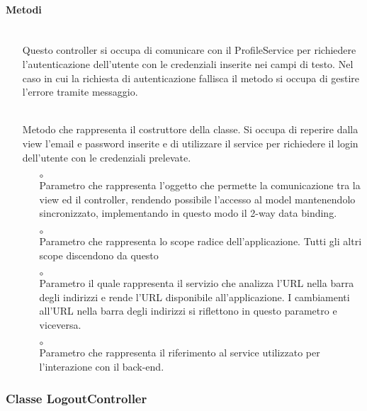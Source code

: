 \paragraph*{Metodi}
\begin{itemize}
\item[]  \\ Questo controller si occupa di comunicare con il ProfileService per richiedere l'autenticazione dell'utente con le credenziali inserite nei campi di testo.
Nel caso in cui la richiesta di autenticazione fallisca il metodo si occupa di gestire l'errore tramite messaggio.
\item[]  \\ Metodo che rappresenta il costruttore della classe. Si occupa di reperire dalla view l'email e password inserite e di utilizzare il service per richiedere il login dell'utente con le credenziali prelevate.
\begin{itemize}\addtolength{\itemsep}{-0.5\baselineskip}
\item[$\circ$]  \\ Parametro che rappresenta l'oggetto che permette la comunicazione tra la view ed il controller, rendendo possibile l’accesso al model mantenendolo sincronizzato, implementando in questo modo il 2-way data binding.
\item[$\circ$]  \\ Parametro che rappresenta lo scope radice dell'applicazione. Tutti gli altri scope discendono da questo
\item[$\circ$]  \\ Parametro il quale rappresenta il servizio che analizza l'URL nella barra degli indirizzi e rende l'URL disponibile all'applicazione. I cambiamenti all'URL nella barra degli indirizzi si riflettono in questo parametro e viceversa.
\item[$\circ$]  \\ Parametro che rappresenta il riferimento al service utilizzato per l'interazione con il back-end.
\end{itemize}
\end{itemize}

\subsubsection{Classe LogoutController}

